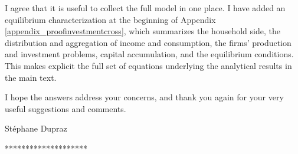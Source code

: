 \documentclass[11pt]{article}
\begin{document}
\begin{enumerate}
I agree that it is useful to collect the full model in one place. I have added an equilibrium characterization at the beginning of Appendix \ref{appendix_proofinvestmentcross}, which summarizes the household side, the distribution and aggregation of income and consumption, the firms' production and investment problems, capital accumulation, and the equilibrium conditions. This makes explicit the full set of equations underlying the analytical results in the main text.

\end{enumerate}

\medskip

I hope the answers address your concerns, and thank you again for your very useful suggestions and comments.

\bigskip
\hspace{3cm}

St\'{e}phane Dupraz

\bigskip
\bigskip
  \begin{center}
  ********************
  \end{center}
\bigskip
\bigskip

{\baselineskip=14pt
	
	}
\end{document}
